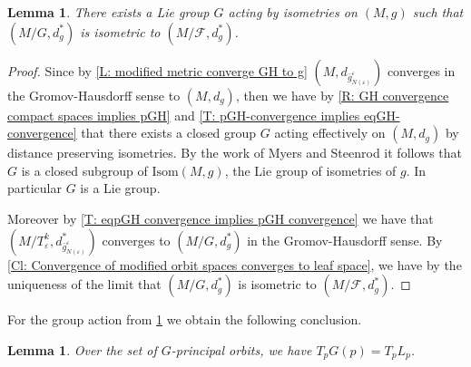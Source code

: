 \documentclass[12pt,a4paper,reqno]{amsart}
\newtheorem{lemma}[theorem]{Lemma}
\theoremstyle{definition}
\numberwithin{equation}{section}
\newcommand{\fol}{\mathcal{F}}
\begin{document}
\begin{lemma}\th\label{L: existence of limit group action for torus actions}
There exists a Lie group $G$ acting by isometries on $(M,g)$ such that $(M/G,d^\ast_g)$ is isometric to $(M/\fol,d^\ast_g)$.
\end{lemma}


\begin{proof}
Since by \th\ref{L: modified metric converge GH to g}  $(M,d_{\bar{g}^\varepsilon_{N(\varepsilon)}})$ converges in the Gromov-Hausdorff sense to \linebreak$(M,d_g)$, then we have by \th\ref{R: GH convergence compact spaces implies pGH} and \th\ref{T: pGH-convergence implies eqGH-convergence} that there exists a closed  group $G$ acting effectively on $(M,d_g)$ by distance preserving isometries. By the work of Myers and Steenrod \cite{MyersSteenrod1939} it follows that $G$ is a closed subgroup of $\mathrm{Isom}(M,g)$, the Lie group of isometries of $g$. In particular $G$ is a Lie group.

Moreover by \th\ref{T: eqpGH convergence implies pGH convergence} we have that $(M/T^k_\varepsilon,d^\ast_{\bar{g}^\varepsilon_{N(\varepsilon)}})$ converges to $(M/G,d_g^\ast)$ in the Gromov-Hausdorff sense. By \th\ref{Cl: Convergence of modified orbit spaces converges to leaf space}, we have by the uniqueness of the limit that $(M/G,d_g^\ast)$ is isometric to $(M/\fol,d^\ast_g)$.
\end{proof}

For the group action from \th\ref{L: existence of limit group action for torus actions} we obtain the following conclusion.

\begin{lemma}\th\label{Cl: Tangent spaces of G principal orbits agree with tangent spaces of leaves}
Over the set of $G$-principal orbits, we have $T_pG(p)= T_pL_p$. 
\end{lemma}
\end{document}
